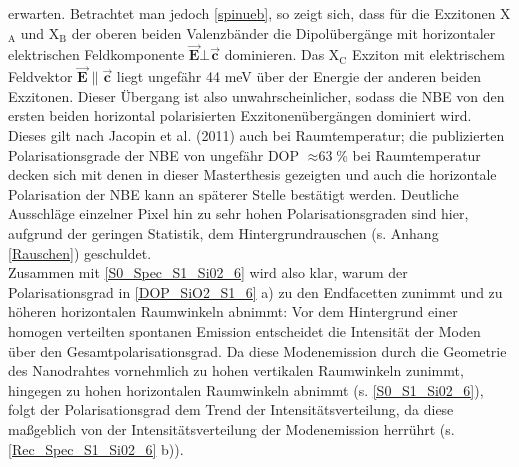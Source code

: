 erwarten. Betrachtet man jedoch \autoref{spinueb}, so zeigt sich, dass für die
Exzitonen X$_\text{A}$ und X$_\text{B}$ der oberen beiden Valenzbänder die
Dipolübergänge mit horizontaler elektrischen Feldkomponente $\vec{\textbf{E}}
\bot \vec{\textbf{c}}$ dominieren. Das X$_\text{C}$ Exziton mit elektrischem
Feldvektor $\vec{\textbf{E}} \| \vec{\textbf{c}}$ liegt ungefähr 44 meV über der
Energie der anderen beiden Exzitonen. Dieser Übergang ist also
unwahrscheinlicher, sodass die NBE von den ersten beiden horizontal
polarisierten Exzitonenübergängen dominiert wird. Dieses gilt nach Jacopin et
al. (2011) \cite{Jacopin.2011} auch bei Raumtemperatur; die publizierten
Polarisationsgrade der NBE von ungefähr DOP $\approx \text{63}$\% bei
Raumtemperatur decken sich mit denen in dieser Masterthesis gezeigten und auch
die horizontale Polarisation der NBE kann an späterer Stelle bestätigt  werden.
Deutliche Ausschläge einzelner Pixel hin zu sehr hohen Polarisationsgraden sind
hier, aufgrund der geringen Statistik, dem Hintergrundrauschen (s. Anhang
\autoref{Rauschen}) geschuldet.\\ Zusammen mit \autoref{S0_Spec_S1_Si02_6} wird
also klar, warum der Polarisationsgrad in \autoref{DOP_SiO2_S1_6} a) zu den
Endfacetten zunimmt und zu höheren horizontalen Raumwinkeln abnimmt: Vor dem
Hintergrund einer homogen verteilten spontanen Emission entscheidet die
Intensität der Moden über den Gesamtpolarisationsgrad. Da diese Modenemission
durch die Geometrie des Nanodrahtes vornehmlich zu hohen vertikalen Raumwinkeln
zunimmt, hingegen zu hohen horizontalen Raumwinkeln abnimmt (s.
\autoref{S0_S1_Si02_6}), folgt der Polarisationsgrad dem Trend der
Intensitätsverteilung, da diese maßgeblich von der Intensitätsverteilung der
Modenemission herrührt (s. \autoref{Rec_Spec_S1_Si02_6} b)).
